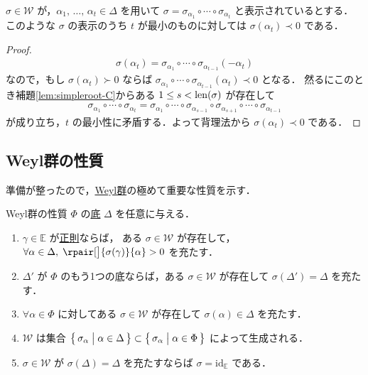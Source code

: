 \documentclass[rep_main]{subfiles}
\begin{document}
\begin{mycol}[label=col:simpleroot-C]{}
	$\sigma \in \mathscr{W}$ が，$\alpha_1,\, \dots,\, \alpha_{t} \in \Delta$ を用いて $\sigma = \sigma_{\alpha_1} \circ \cdots \circ \sigma_{\alpha_t}$ と表示されているとする．
	このような $\sigma$ の表示のうち $t$ が最小のものに対しては $\sigma(\alpha_{t}) \prec 0$ である．
\end{mycol}

\begin{proof}
	\begin{align}
		\sigma(\alpha_{t}) = \sigma_{\alpha_1} \circ \cdots \circ \sigma_{\alpha_{t - 1}} (-\alpha_{t})
	\end{align}
	なので，もし $\sigma(\alpha_{t}) \succ 0$ ならば $\sigma_{\alpha_1} \circ \cdots \circ \sigma_{\alpha_{t - 1}}(\alpha_{t}) \prec 0$ となる．
	然るにこのとき補題\ref{lem:simpleroot-C}からある $1 \le s < \operatorname{len} (\sigma)$ が存在して
	\begin{align}
		\sigma_{\alpha_1} \circ \cdots \circ \sigma_{\alpha_{t}} = \sigma_{\alpha_1} \circ \cdots \circ \sigma_{\alpha_{s-1}} \circ \sigma_{\alpha_{s+1}} \circ \cdots \circ \sigma_{\alpha_{t -1}}
	\end{align}
	が成り立ち，$t$ の最小性に矛盾する．よって背理法から $\sigma(\alpha_{t}) \prec 0$ である．
\end{proof}

\subsection{Weyl群の性質}

準備が整ったので，\hyperref[def:Weylgroup]{Weyl群}の極めて重要な性質を示す．

\begin{mytheo}[label=thm:Weylgroup-basic]{Weyl群の性質}
	$\Phi$ の\hyperref[def:base-root]{底} $\Delta$ を任意に与える．
	\begin{enumerate}
		\item $\gamma \in \mathbb{E}$ が\hyperref[def:decomposable]{正則}ならば，
		ある $\sigma \in \mathscr{W}$ が存在して，$\forall \alpha \in \Delta,\; \rpair[\big]{\sigma(\gamma)}{\alpha} > 0$ を充たす．
		\item $\Delta'$ が $\Phi$ のもう1つの底ならば，ある $\sigma \in \mathscr{W}$ が存在して $\sigma (\Delta') = \Delta$ を充たす．
		\item $\forall \alpha \in \Phi$ に対してある $\sigma \in \mathscr{W}$ が存在して $\sigma(\alpha) \in \Delta$ を充たす．
		\item $\mathscr{W}$ は集合 $\bigl\{\, \sigma_\alpha \bigm| \alpha \in \Delta \,\bigr\} \subset \bigl\{\, \sigma_\alpha \bigm| \alpha \in \Phi \,\bigr\} $ によって生成される．
		\item $\sigma \in \mathscr{W}$ が $\sigma (\Delta) = \Delta$ を充たすならば $\sigma = \mathrm{id}_{\mathbb{E}}$ である．
	\end{enumerate}
	
\end{mytheo}
\end{document}
